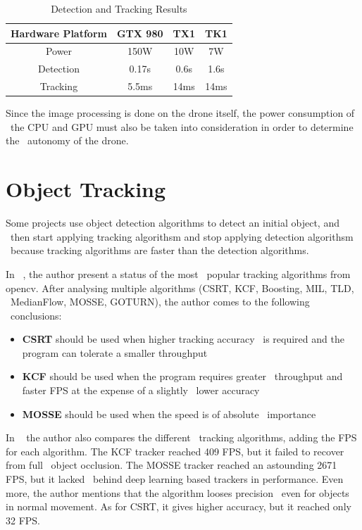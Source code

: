 \begin{table}[ht]
    \caption{Detection and Tracking Results}
    \centering
    \begin{tabular}{|c|c|c|c|}
        \hline\hline
        Hardware Platform & GTX 980 & TX1 & TK1 \\
        \hline
        Power & 150W & 10W & 7W \\
        Detection & 0.17s & 0.6s & 1.6s \\
        Tracking & 5.5ms & 14ms & 14ms \\
        \hline
    \end{tabular}
    \label{table:deep-drone-results}
\end{table}

Since the image processing is done on the drone itself, the power consumption of \
the CPU and GPU must also be taken into consideration in order to determine the \
autonomy of the drone.

\section{Object Tracking}
\label{sec:research-tracking}
Some projects use object detection algorithms to detect an initial object, and \
then start applying tracking algorithsm and stop applying detection algorithsm \
because tracking algorithms are faster than the detection algorithms.

In ~\cite{OpencvTracking}, the author present a status of the most \
popular tracking algorithms from opencv.
After analysing multiple algorithms (CSRT, KCF, Boosting, MIL, TLD, \
MedianFlow, MOSSE, GOTURN), the author comes to the following \
conclusions:
\begin{itemize}
    \item \textbf{CSRT} should be used when higher tracking accuracy \
            is required and the program can tolerate a smaller throughput
    \item \textbf{KCF} should be used when the program requires greater \
            throughput and faster FPS at the expense of a slightly \
            lower accuracy
    \item \textbf{MOSSE} should be used when the speed is of absolute \
            importance
\end{itemize}

In ~\cite{OpencvTracking2} the author also compares the different \
tracking algorithms, adding the FPS for each algorithm.
The KCF tracker reached 409 FPS, but it failed to recover from full \
object occlusion.
The MOSSE tracker reached an astounding 2671 FPS, but it lacked \
behind deep learning based trackers in performance.
Even more, the author mentions that the algorithm looses precision \
even for objects in normal movement.
As for CSRT, it gives higher accuracy, but it reached only 32 FPS.


